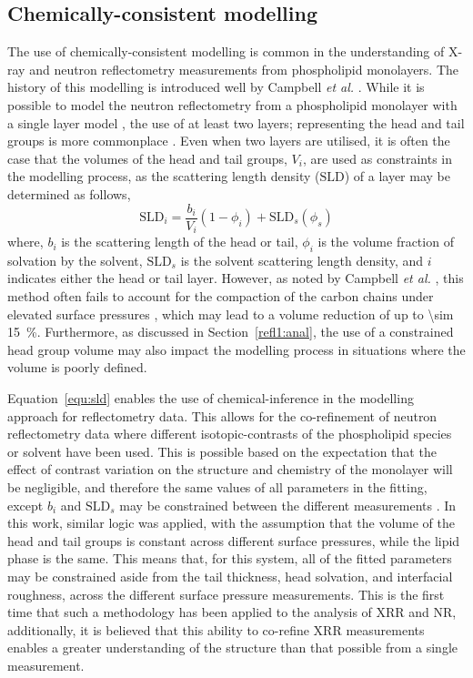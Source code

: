 \subsection{Chemically-consistent modelling}
The use of chemically-consistent modelling is common in the understanding of X-ray and neutron reflectometry measurements from phospholipid monolayers.
The history of this modelling is introduced well by Campbell \emph{et al.} \cite{campbell_structure_2018}.
While it is possible to model the neutron reflectometry from a phospholipid monolayer with a single layer model \cite{wojciechowski_interaction_2016,wojciechowski_complexation_2016}, the use of at least two layers; representing the head and tail groups is more commonplace \cite{foglia_interaction_2014,bello_influence_2016}.
Even when two layers are utilised, it is often the case that the volumes of the head and tail groups, $V_i$, are used as constraints in the modelling process, as the scattering length density ($\text{SLD}$) of a layer may be determined as follows,
%
\begin{equation}
\text{SLD}_i = \frac{b_i}{V_i}(1-\phi_i)+\text{SLD}_s(\phi_s)
\label{equ:sld}
\end{equation}
%
where, $b_i$ is the scattering length of the head or tail, $\phi_i$ is the volume fraction of solvation by the solvent, $\text{SLD}_s$ is the solvent scattering length density, and $i$ indicates either the head or tail layer.
However, as noted by Campbell \emph{et al.} \cite{campbell_structure_2018}, this method often fails to account for the compaction of the carbon chains under elevated surface pressures \cite{mcconlogue_close_1997,small_lateral_1984}, which may lead to a volume reduction of up to \SI{\sim 15}{\percent}.
Furthermore, as discussed in Section~\ref{refl1:anal}, the use of a constrained head group volume may also impact the modelling process in situations where the volume is poorly defined.

Equation~\ref{equ:sld} enables the use of chemical-inference in the modelling approach for reflectometry data.
This allows for the co-refinement of neutron reflectometry data where different isotopic-contrasts of the phospholipid species or solvent have been used.
This is possible based on the expectation that the effect of contrast variation on the structure and chemistry of the monolayer will be negligible, and therefore the same values of all parameters in the fitting, except $b_i$ and $\text{SLD}_s$ may be constrained between the different measurements \cite{hollinshead_effects_2009}.
In this work, similar logic was applied, with the assumption that the volume of the head and tail groups is constant across different surface pressures, while the lipid phase is the same.
This means that, for this system, all of the fitted parameters may be constrained aside from the tail thickness, head solvation, and interfacial roughness, across the different surface pressure measurements.
This is the first time that such a methodology has been applied to the analysis of XRR and NR, additionally, it is believed that this ability to co-refine XRR measurements enables a greater understanding of the structure than that possible from a single measurement.
